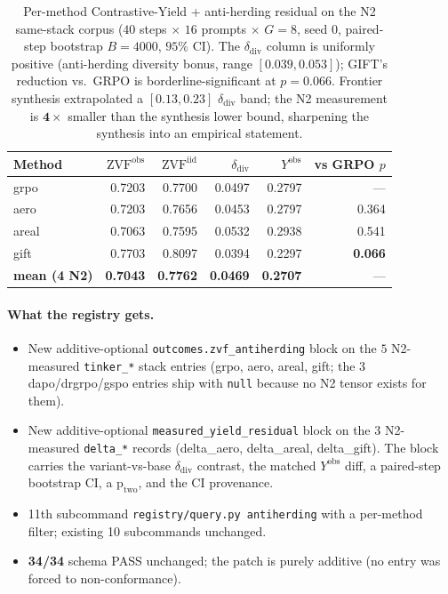\begin{table}[h]
\centering
\small
\begin{tabular}{lrrrrr}
\toprule
\textbf{Method} & $\mathrm{ZVF}^{\mathrm{obs}}$ & $\mathrm{ZVF}^{\mathrm{iid}}$ & $\delta_{\mathrm{div}}$ & $Y^{\mathrm{obs}}$ & vs GRPO $p$ \\
\midrule
grpo   & 0.7203 & 0.7700 & 0.0497 & 0.2797 & --- \\
aero   & 0.7203 & 0.7656 & 0.0453 & 0.2797 & 0.364 \\
areal  & 0.7063 & 0.7595 & 0.0532 & 0.2938 & 0.541 \\
gift   & 0.7703 & 0.8097 & 0.0394 & 0.2297 & \textbf{0.066} \\
\midrule
\textbf{mean (4 N2)} & \textbf{0.7043} & \textbf{0.7762} & \textbf{0.0469} & \textbf{0.2707} & --- \\
\bottomrule
\end{tabular}
\caption{Per-method Contrastive-Yield + anti-herding residual on the N2
same-stack corpus ($40$ steps $\times$ $16$ prompts $\times$ $G=8$,
seed $0$, paired-step bootstrap $B=4000$, $95\%$ CI). The $\delta_{\mathrm{div}}$
column is uniformly positive (anti-herding diversity bonus, range
$[0.039, 0.053]$); GIFT's reduction vs.\ GRPO is borderline-significant
at $p=0.066$. Frontier synthesis extrapolated a $[0.13, 0.23]$
$\delta_{\mathrm{div}}$ band; the N2 measurement is
$\mathbf{4\times}$ smaller than the synthesis lower bound, sharpening
the synthesis into an empirical statement.}
\label{tab:p6-zvf-antiherding}
\end{table}

\paragraph{What the registry gets.}
\begin{itemize}
  \item New additive-optional \texttt{outcomes.zvf\_antiherding} block on
        the $5$ N2-measured \texttt{tinker\_*} stack entries (grpo,
        aero, areal, gift; the 3 dapo/drgrpo/gspo entries ship with
        \texttt{null} because no N2 tensor exists for them).
  \item New additive-optional \texttt{measured\_yield\_residual} block
        on the 3 N2-measured \texttt{delta\_*} records (delta\_aero,
        delta\_areal, delta\_gift). The block carries the variant-vs-base
        $\delta_{\mathrm{div}}$ contrast, the matched $Y^{\mathrm{obs}}$
        diff, a paired-step bootstrap CI, a $\mathrm{p_{two}}$, and the
        CI provenance.
  \item 11th subcommand \texttt{registry/query.py antiherding} with
        a per-method filter; existing 10 subcommands unchanged.
  \item \textbf{34/34} schema PASS unchanged; the patch is purely
        additive (no entry was forced to non-conformance).
\end{itemize}

